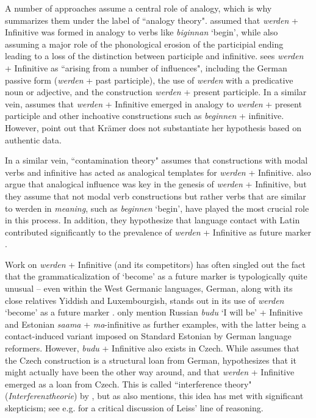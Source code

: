 \documentclass[output=paper,colorlinks,citecolor=brown]{langscibook}
\begin{document}
A number of approaches assume a central role of analogy, which is why \citet[237]{Westvik2000}{} summarizes them under the label of ``analogy theory". \citet[]{Wilmanns1899}{} assumed that \textit{werden} + Infinitive was formed in analogy to verbs like \textit{biginnan} `begin', while also assuming a major role of the phonological erosion of the participial ending leading to a loss of the distinction between participle and infinitive. \citet[9]{kurrelmeyer1904}{} sees \textit{werden} + Infinitive as ``arising from a number of influences", including the German passive form (\textit{werden} + past participle), the use of \textit{werden} with a predicative noun or adjective, and the construction \textit{werden} + present participle. In a similar vein, \citet[]{Kraemer2005}{} assumes that \textit{werden} + Infinitive emerged in analogy to \textit{werden} + present participle and other inchoative constructions such as \textit{beginnen} + infinitive. However, \citet[140]{fleischerHistorischeSyntaxDeutschen2011}{} point out that Krämer does not substantiate her hypothesis based on authentic data.

In a similar vein,  ``contamination theory" assumes that constructions with modal verbs and infinitive has acted as analogical templates for \textit{werden} + Infinitive. \citet[][]{DiewaldHabermann2005}{}{} also argue that analogical influence was key in the genesis of \textit{werden} + Infinitive, but they assume that not modal verb constructions but rather verbs that are similar to werden in \textit{meaning}, such as \textit{beginnen} `begin', have played the most crucial role in this process. In addition, they hypothesize that language contact with Latin contributed significantly to the prevalence of \textit{werden} + Infinitive as future marker \citep[241]{DiewaldHabermann2005}{}. 

Work on \textit{werden} + Infinitive (and its competitors) has often singled out the fact that the grammaticalization of `become' as a future marker is typologically quite unusual \citep[e.g.][125]{Heine1995} -- even within the West Germanic languages, German, along with its close relatives Yiddish and Luxembourgish, stands out in its use of \textit{werden} `become' as a future marker \citep[][364]{abrahamFuturTypologieGermanischenSprachen1989}. \citet[][86]{Kuteva2019} only mention Russian \textit{budu} `I will be' + Infinitive and Estonian \textit{saama} + \textit{ma}-infinitive as further examples, with the latter being a contact-induced variant imposed on Standard Estonian by German language reformers. However, \textit{budu} + Infinitive also exists in Czech. While \citet[]{roslerBeobachtungenUndGedanken1952} assumes that the Czech construction is a structural loan from German, \citet[]{leissZurEntstehungNeuhochdeutschen1985} hypothesizes that it might actually have been the other way around, and that \textit{werden} + Infinitive emerged as a loan from Czech. This is called ``interference theory" (\textit{Interferenztheorie}) by \citet[236]{Westvik2000}, but as \citet[]{Westvik2000}
 also mentions, this idea has met with significant skepticism; see e.g. \citet[156--157]{Kotin2003} for a critical discussion of Leiss' line of reasoning.
\end{document}
